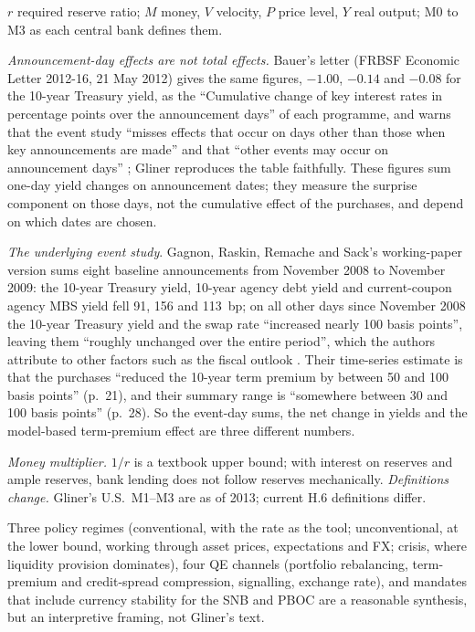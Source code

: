 \begin{qfdefinition}
 $r$ required reserve ratio; $M$ money, $V$ velocity, $P$ price level, $Y$ real output; M0 to M3 as each central bank defines them.

 \emph{Announcement-day effects are not total effects.} Bauer's letter (FRBSF Economic Letter 2012-16, 21 May 2012) gives the same figures, $-1.00$, $-0.14$ and $-0.08$ for the 10-year Treasury yield, as the ``Cumulative change of key interest rates in percentage points over the announcement days'' of each programme, and warns that the event study ``misses effects that occur on days other than those when key announcements are made'' and that ``other events may occur on announcement days'' \citep[Table~1 and text]{bauer-2012}; Gliner reproduces the table faithfully. These figures sum one-day yield changes on announcement dates; they measure the surprise component on those days, not the cumulative effect of the purchases, and depend on which dates are chosen.

\emph{The underlying event study}. Gagnon, Raskin, Remache and Sack's working-paper version sums eight baseline announcements from November 2008 to November 2009: the 10-year Treasury yield, 10-year agency debt yield and current-coupon agency MBS yield fell 91, 156 and 113~bp; on all other days since November 2008 the 10-year Treasury yield and the swap rate ``increased nearly 100 basis points'', leaving them ``roughly unchanged over the entire period'', which the authors attribute to other factors such as the fiscal outlook \citep[pp.~17--18 (PDF pp.~19--20)]{nyfed-sr441}. Their time-series estimate is that the purchases ``reduced the 10-year term premium by between 50 and 100 basis points'' (p.~21), and their summary range is ``somewhere between 30 and 100 basis points'' (p.~28). So the event-day sums, the net change in yields and the model-based term-premium effect are three different numbers.

\emph{Money multiplier.} $1/r$ is a textbook upper bound; with interest on reserves and ample reserves, bank lending does not follow reserves mechanically. \emph{Definitions change.} Gliner's U.S.\ M1--M3 are as of 2013; current H.6 definitions differ.

 Three policy regimes (conventional, with the rate as the tool; unconventional, at the lower bound, working through asset prices, expectations and FX; crisis, where liquidity provision dominates), four QE channels (portfolio rebalancing, term-premium and credit-spread compression, signalling, exchange rate), and mandates that include currency stability for the SNB and PBOC are a reasonable synthesis, but an interpretive framing, not Gliner's text.


\end{qfdefinition}
